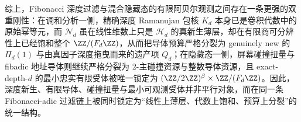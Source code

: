 \noindent
综上，Fibonacci 深度过滤与混合隐藏态的有限阿贝尔观测之间存在一条更强的双重刚性：在调和分析一侧，精确深度 Ramanujan 包核 \(K_d\) 本身已是卷积代数中的原始幂等元，而 \(\mathcal N_d\) 虽在线性维数上只是 \(\mathcal H_d\) 的真新生薄层，却在有限商可分辨性上已经饱和整个 \(\ZZ/(F_d\ZZ)\)，从而把导体预算严格分裂为 genuinely new 的 \(\Pi_d(1)\) 与由真因子深度拖曳而来的遗产项 \(Q_d\)；在隐藏态一侧，屏幕碰撞扭量与 fibadic 地址导体则继续严格分裂为 \(2\)-主碰撞资源与整数导体资源，且 exact-depth-\(d\) 的最小忠实有限受体被唯一锁定为 \((\ZZ/2\ZZ)^\beta\times \ZZ/(F_d\ZZ)\)。因此，深度新生、有限导体、碰撞扭量与最小可观测受体并非平行对象，而在同一条 Fibonacci-adic 过滤链上被同时锁定为“线性上薄层、代数上饱和、预算上分裂”的统一结构。

\endinput
